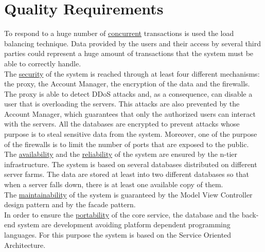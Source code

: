 \section{Quality Requirements}
To respond to a huge number of \underline{concurrent} transactions is used the load balancing technique.
Data provided by the users and their access by several third parties could represent a huge amount of transactions that the system must be able to correctly handle.\\
The \underline{security} of the system is reached through at least four different mechanisms: the proxy, the Account Manager, the encryption of the data and the firewalls.\\
The proxy is able to detect DDoS attacks and, as a consequence, can disable a user that is overloading the servers.
This attacks are also prevented by the Account Manager, which guarantees that only the authorized users can interact with the servers.
All the databases are encrypted to prevent attacks whose purpose is to steal sensitive data from the system.
Moreover, one of the purpose of the firewalls is to limit the number of ports that are exposed to the public.\\
The \underline{availability} and the \underline{reliability} of the system are ensured by the n-tier infrastructure. The system is based on several databases distributed on different server farms. The data are stored at least into two different databases so that when a server falls down, there is at least one available copy of them.\\
The \underline{maintainability} of the system is guaranteed by the Model View Controller design pattern and by the facade pattern. \\
In order to ensure the \underline{portability} of the core service, the database and the back-end system are development avoiding platform dependent programming languages. For this purpose the system is based on the Service Oriented Architecture.
